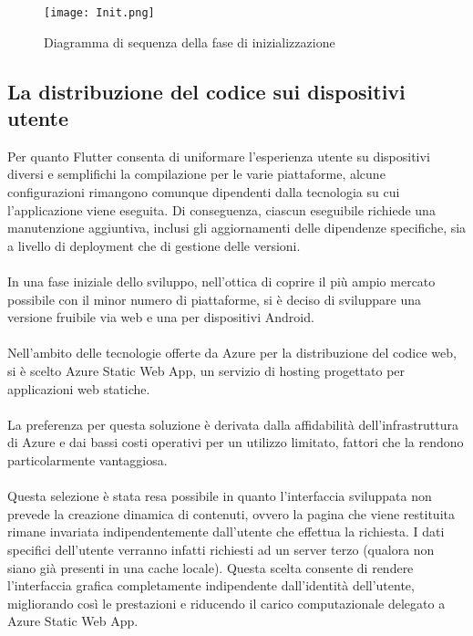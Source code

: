 \begin{figure}[h!]
    \begin{center}
        \texttt{[image: Init.png]}
        \caption{Diagramma di sequenza della fase di inizializzazione }
    \end{center}
\end{figure}


\clearpage

\subsection{La distribuzione del codice sui dispositivi utente}

Per quanto Flutter consenta di uniformare l'esperienza utente su dispositivi diversi e semplifichi la compilazione per le varie piattaforme,
alcune configurazioni rimangono comunque dipendenti dalla tecnologia su cui l'applicazione viene eseguita.
Di conseguenza, ciascun eseguibile richiede una manutenzione aggiuntiva, inclusi gli aggiornamenti delle dipendenze specifiche,
sia a livello di deployment che di gestione delle versioni.\\
\\
In una fase iniziale dello sviluppo, nell'ottica di coprire il più ampio mercato possibile con il minor numero di piattaforme,
si è deciso di sviluppare una versione fruibile via web e una per dispositivi Android.\\
\\
Nell'ambito delle tecnologie offerte da Azure per la  distribuzione del codice web, si è scelto Azure Static Web App, un servizio di hosting progettato per applicazioni web statiche. \\
\\
La preferenza per questa soluzione è derivata dalla affidabilità dell'infrastruttura di Azure e dai bassi costi operativi per un utilizzo limitato,
fattori che la rendono particolarmente vantaggiosa.\\
\\
Questa selezione è stata resa possibile in quanto l’interfaccia sviluppata non prevede la creazione dinamica di contenuti,
ovvero la pagina che viene restituita rimane invariata indipendentemente dall’utente che effettua la richiesta.
I dati specifici dell’utente verranno infatti richiesti ad un server terzo (qualora non siano già presenti in una cache locale).
Questa scelta consente di rendere l’interfaccia grafica completamente indipendente dall’identità dell’utente,
migliorando così le prestazioni e riducendo il carico computazionale delegato a Azure Static Web App.\\
